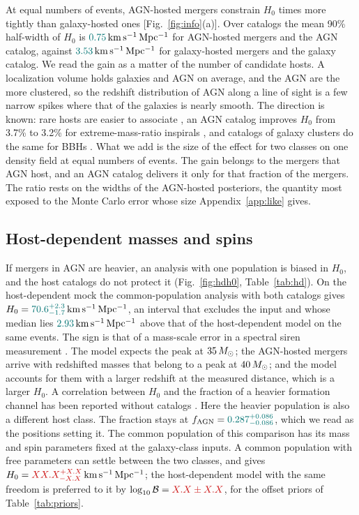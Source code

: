 \documentclass[aps,prd,reprint,twocolumn,superscriptaddress,nofootinbib,floatfix]{revtex4-2}
\newcommand{\msun}{\,M_\odot}
\newcommand{\kms}{{\rm km\,s^{-1}\,Mpc^{-1}}}
\newcommand{\fagn}{f_{\rm AGN}}
\newcommand{\lB}{\log_{10}\mathcal{B}}
\providecommand{\PureGalHostsPerVol}{\ph{XXXX}}        %
\providecommand{\PureAGNHostsPerVol}{\ph{XX}}          %
\providecommand{\CommonFreeHzero}{\ph{XX.X^{+X.X}_{-X.X}}} %
\providecommand{\LBHDVsCommonFree}{\ph{X.X\pm X.X}}    %
\begin{document}
At equal numbers of events, AGN-hosted mergers constrain $H_0$
\PureRatioNinety{} times more tightly than galaxy-hosted ones
[Fig.~\ref{fig:info}(a)]. Over \PureNcat{} catalogs the mean 90\% half-width
of $H_0$ is $\PureAGNHalfNinety\,\kms$ for \MockNev{} AGN-hosted mergers and
the AGN catalog, against $\PureGalHalfNinety\,\kms$ for \MockNev{}
galaxy-hosted mergers and the galaxy catalog. We read the gain as a matter
of the number of candidate hosts. A localization volume holds
\PureGalHostsPerVol{} galaxies and \PureAGNHostsPerVol{} AGN on average, and
the AGN are the more clustered, so the redshift distribution of AGN along a
line of sight is a few narrow spikes where that of the galaxies is nearly
smooth. The direction is known:
rare hosts are easier to associate
\cite{Bartos:2017ggb,Alves:2020wnl,Bom:2023zgw,Pouw:2026lar}, an AGN catalog
improves $H_0$ from 3.7\% to 3.2\% for extreme-mass-ratio inspirals
\cite{Zhu:2024qpp}, and catalogs of galaxy clusters do the same for BBHs
\cite{Beirnaert:2025wcx}. What we add is the size of the effect for two
classes on one density field at equal numbers of events. The gain belongs to
the mergers that AGN host, and an AGN catalog delivers it only for that
fraction of the mergers. The ratio rests on the widths of the AGN-hosted
posteriors, the quantity most exposed to the Monte Carlo error whose size
Appendix~\ref{app:like} gives.

\subsection{Host-dependent masses and spins}
\label{sec:hd}

If mergers in AGN are heavier, an analysis with one population is biased in
$H_0$, and the host catalogs do not protect it (Fig.~\ref{fig:hdh0},
Table~\ref{tab:hd}). On the host-dependent mock the common-population
analysis with both catalogs gives $H_0=\CommonHzero\,\kms$, an interval that
excludes the input \MockHzero{} and whose median lies
$\ShiftCommonMinusFix\,\kms$ above that of the host-dependent model on the
same events. The sign is that of a mass-scale error in a spectral siren
measurement
\cite{Farr:2019twy,Ezquiaga:2022zkx,Mastrogiovanni:2021wsd,Pierra:2023deu}.
The model expects the peak at $\MockMuG\msun$; the AGN-hosted mergers arrive
with redshifted masses that belong to a peak at $\MockMuGAGN\msun$; and the
model accounts for them with a larger redshift at the measured distance,
which is a larger $H_0$. A correlation between $H_0$ and the fraction of a
heavier formation channel has been reported without catalogs
\cite{Scarpa:2026piy}. Here the heavier population is also a different host
class. The fraction stays at $\fagn=\CommonfAGN$, which we read as the
positions setting it. The common population of this comparison has its mass and spin
parameters fixed at the galaxy-class inputs. A common population with free parameters can settle between the two classes,
and gives $H_0=\CommonFreeHzero\,\kms$; the host-dependent model with the
same freedom is preferred to it by $\lB=\LBHDVsCommonFree$, for the offset
priors of Table~\ref{tab:priors}.
\end{document}
